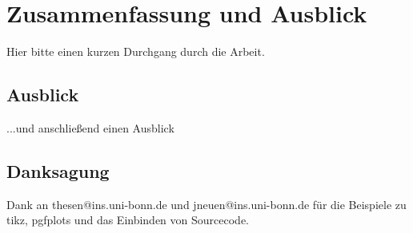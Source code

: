 \chapter{Zusammenfassung und Ausblick}\label{chap:zusfas}
Hier bitte einen kurzen Durchgang durch die Arbeit.

\section*{Ausblick}
...und anschließend einen Ausblick

\section*{Danksagung}
Dank an thesen@ins.uni-bonn.de und jneuen@ins.uni-bonn.de f\"ur die Beispiele zu tikz, pgfplots und das Einbinden von Sourcecode.

